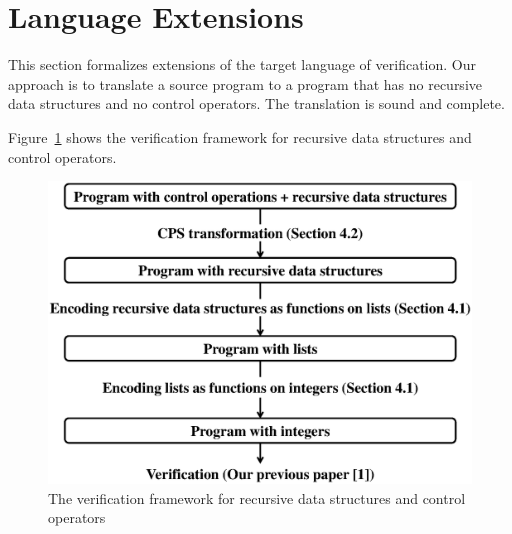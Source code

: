 \section{Language Extensions}
\label{sec:extension}

This section formalizes extensions of the target language of
verification.  Our approach is to translate a source program to a
program that has no recursive data structures and no control operators.
The translation is sound and complete.

Figure~\ref{fig:extension} shows the verification framework for recursive data structures and control
operators.

\begin{figure}[t]
 \begin{center}
  \includegraphics[scale=0.4]{extension.eps}
 \end{center}
\caption{The verification framework for recursive data structures and control operators}
\label{fig:extension}
\end{figure}

